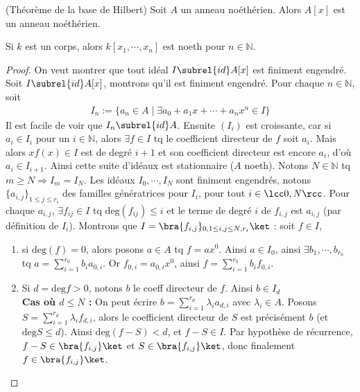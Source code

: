         \begin{theo} (Théorème de la base de Hilbert)
            \label{base_de_hilbert}
            Soit $A$ un anneau noéthérien. Alors $A[x]$ est un anneau noéthérien.
        \end{theo}
        \begin{coro}
            Si $k$ est un corps, alors $k[x_1, \cdots, x_n]$ est noeth pour $n \in \mathbb{N}$.
        \end{coro}
        \begin{proof}
            On veut montrer que tout idéal $I \subrel{id} A[x]$ est finiment engendré. Soit $I \subrel{id} A[x]$, montrons qu'il est finiment engendré. Pour chaque $n \in \mathbb{N}$, soit
            \begin{align*}
                I_n := \{a_n \in A \mid \exists a_0 + a_1x + \cdots + a_n x^n \in I\}
            \end{align*}
            Il est facile de voir que $I_n \subrel{id} A$. Ensuite $(I_i)$ est croissante, car si $a_i \in I_i$ pour un $i \in \mathbb{N}$, alors $\exists f \in I$ tq le coefficient directeur de $f$ soit $a_i$. Mais alors $xf(x) \in I$ est de degré $i+1$ et son coefficient directeur est encore $a_i$, d'où $a_i \in I_{i+1}$. Ainsi cette suite d'idéaux est stationnaire ($A$ noeth). Notons $N \in \mathbb{N}$ tq $m \geq N \Rightarrow I_m = I_N$. Les idéaux $I_0, \cdots, I_N$ sont finiment engendrés, notons $\{a_{i,j}\}_{1 \leq j \leq r_i}$ des familles génératrices pour $I_i$, pour tout $i \in \lcc 0, N \rcc$. Pour chaque $a_{i,j}$, $\exists f_{ij} \in I$ tq $\mathrm{deg}(f_{ij}) \leq i$ et le terme de degré $i$ de $f_{i,j}$ est $a_{i,j}$ (par définition de $I_i$). Montrons que $I = \bra \{f_{i,j}\}_{0,1 \leq i,j \leq N,r_i} \ket$ : soit $f \in I$,
            \begin{enumerate}
                \item si $\mathrm{deg}(f) = 0$, alors posons $a \in A$ tq $f = ax^0$. Ainsi $a \in I_0$, ainsi $\exists b_1, \cdots, b_{r_0}$ tq $a = \sum_{i = 1}^{r_0} b_i a_{0,i}$. Or $f_{0,i} = a_{0,i}x^0$, ainsi $f = \sum_{i = 1}^{r_0} b_i f_{0,i}$.
                \item Si $d = \mathrm{deg} f > 0$, notons $b$ le coeff directeur de $f$. Ainsi $b \in I_d$ \\
                \textbf{Cas où $d \leq N$ :} On peut écrire $b = \sum_{i = 1}^{r_d} \lambda_i a_{d,i}$ avec $\lambda_i \in A$. Posons $S = \sum_{i = 1}^{r_d} \lambda_i f_{d,i}$, alors le coefficient directeur de $S$ est précisément $b$ (et $\mathrm{deg} S \leq d$). Ainsi $\mathrm{deg} (f-S) < d$, et $f - S \in I$. Par hypothèse de récurrence, $f - S \in \bra \{f_{i,j}\} \ket$ et $S \in \bra \{f_{i,j}\} \ket$, donc finalement $f \in \bra \{f_{i,j}\} \ket$. \\

\end{enumerate}
\end{proof}
